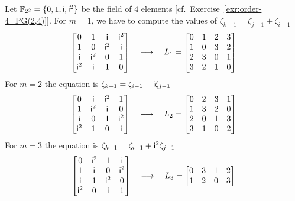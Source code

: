 \begin{test}
    Let $\Fq[2^2]=\set{0,1,\iq,\iq^2}$ be the field of $4$ elements [cf.~Exercise~\ref{exr:order-4=PG(2,4)}]. For $m=1$, we have to compute the values of $\zeta_{k-1}=\zeta_{j-1}+\zeta_{i-1}$
    $$
        \begin{bmatrix}
            0   &1  &\iq  &\iq^2\\
            1   &0  &\iq^2&\iq\\
            \iq   &\iq^2&0  &1\\
            \iq^2 &\iq  &1  &0
        \end{bmatrix}
        \quad\longrightarrow\quad
        L_1 = \begin{bmatrix}
            0   &1  &2  &3\\
            1   &0  &3  &2\\
            2   &3  &0  &1\\
            3   &2  &1  &0
        \end{bmatrix}
    $$
    For $m=2$ the equation is $\zeta_{k-1}=\zeta_{i-1}+\iq\zeta_{j-1}$
    $$
        \begin{bmatrix}
            0   &\iq    &\iq^2  &1\\
            1   &\iq^2  &\iq    &0\\
            \iq &0      &1      &\iq^2\\
            \iq^2&1     &0      &\iq
        \end{bmatrix}
        \quad\longrightarrow\quad
        L_2 = \begin{bmatrix}
            0   &2  &3  &1\\
            1   &3  &2  &0\\
            2   &0  &1  &3\\
            3   &1  &0  &2
        \end{bmatrix}
    $$
    For $m=3$ the equation is $\zeta_{k-1}=\zeta_{i-1}+\iq^2\zeta_{j-1}$
    $$
        \begin{bmatrix}
            0   &\iq^2  &1      &\iq\\
            1   &\iq    &0      &\iq^2\\
            \iq &1      &\iq^2  &0\\
            \iq^2&0     &\iq    &1
        \end{bmatrix}
        \quad\longrightarrow\quad
        L_3 = \begin{bmatrix}
            0   &3  &1  &2\\
            1   &2  &0  &3\\

\end{bmatrix}$$
\end{test}
